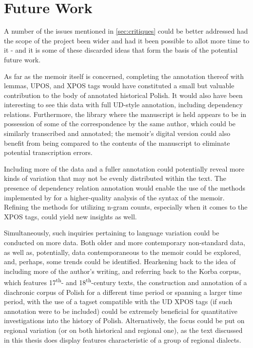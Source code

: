 \section{Future Work}
\label{sec:futurework}

A number of the issues mentioned in \autoref{sec:critiques} could be better addressed had the scope of the project been wider and had it been possible to allot more time to it - and it is some of these discarded ideas that form the basis of the potential future work. 

As far as the memoir itself is concerned, completing the annotation thereof with lemmas, UPOS, and XPOS tags would have constituted a small but valuable contribution to the body of annotated historical Polish. It would also have been interesting to see this data with full UD-style annotation, including dependency relations. Furthermore, the library where the manuscript is held appears to be in possession of some of the correspondence by the same author, which could be similarly transcribed and annotated; the memoir's digital version could also benefit from being compared to the contents of the manuscript to eliminate potential transcription errors.

Including more of the data and a fuller annotation could potentially reveal more kinds of variation that may not be evenly distributed within the text. The presence of dependency relation annotation would enable the use of the methods implemented by \citet{johannsen-etal-2015-cross} for a higher-quality analysis of the syntax of the memoir. Refining the methods for utilizing n-gram counts, especially when it comes to the XPOS tags, could yield new insights as well.

Simultaneously, such inquiries pertaining to language variation could be conducted on more data. Both older and more contemporary non-standard data, as well as, potentially, data contemporaneous to the memoir could be explored, and, perhaps, some trends could be identified. Hearkening back to the idea of including more of the author's writing, and referring back to the Korba corpus, which features 17\textsuperscript{th}- and 18\textsuperscript{th}-century texts, the construction and annotation of a diachronic corpus of Polish for a different time period or spanning a larger time period, with the use of a tagset compatible with the UD XPOS tags (if such annotation were to be included) could be extremely beneficial for quantitative investigations into the history of Polish. Alternatively, the focus could be put on regional variation (or on both historical and regional one), as the text discussed in this thesis does display features characteristic of a group of regional dialects.

